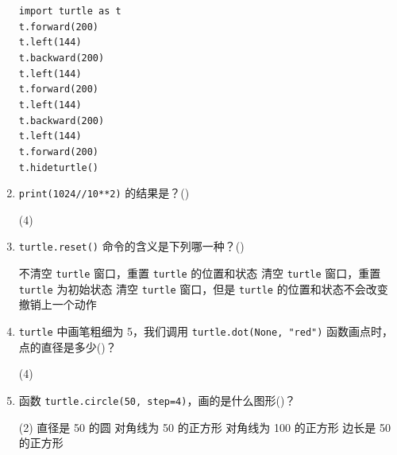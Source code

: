 \documentclass[11pt]{ctexart}
\begin{document}
\begin{enumerate}
\begin{tasks}
            \task \lstinline{import turtle as t}\\
            \lstinline{t.forward(200)}\\
            \lstinline{t.left(144)}\\
            \lstinline{t.backward(200)}\\
            \lstinline{t.left(144)}\\
            \lstinline{t.forward(200)}\\
            \lstinline{t.left(144)}\\
            \lstinline{t.backward(200)}\\
            \lstinline{t.left(144)}\\
            \lstinline{t.forward(200)}\\
            \lstinline{t.hideturtle()} 
        \end{tasks}

        \item \lstinline{print(1024//10**2)} 的结果是？(\qquad)
        \begin{tasks}(4)
        \end{tasks}

        \newpage
        \item  \lstinline{turtle.reset()} 命令的含义是下列哪一种？(\qquad)
        \begin{tasks}
            \task 不清空 \lstinline{turtle} 窗口，重置 \lstinline{turtle} 的位置和状态
            \task 清空 \lstinline{turtle} 窗口，重置 \lstinline{turtle} 为初始状态
            \task 清空 \lstinline{turtle} 窗口，但是 \lstinline{turtle} 的位置和状态不会改变
            \task 撤销上一个动作
        \end{tasks}

        \item \lstinline{turtle} 中画笔粗细为 5，我们调用 \lstinline{turtle.dot(None, "red")} 函数画点时，点的直径是多少(\qquad)？
        \begin{tasks}(4)
        \end{tasks}
        
        \item 函数 \lstinline{turtle.circle(50, step=4)}，画的是什么图形(\qquad)？
        \begin{tasks}(2)
            \task 直径是 50 的圆
            \task 对角线为 50 的正方形
            \task 对角线为 100 的正方形
            \task 边长是 50 的正方形
        \end{tasks}


\end{enumerate}
\end{document}
